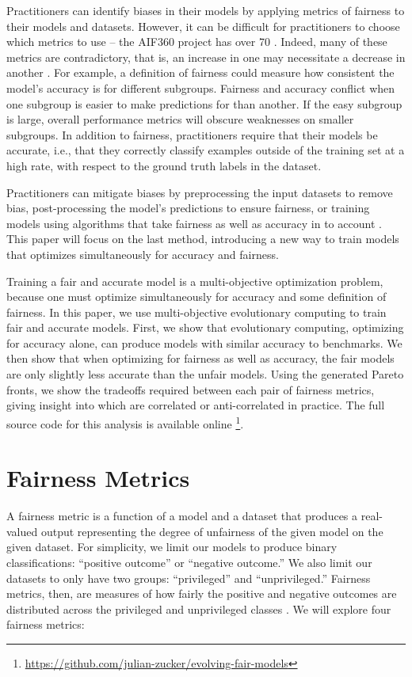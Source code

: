 \documentclass{elsarticle}
\begin{document}
Practitioners can identify biases in their models by applying metrics of fairness to their models and datasets. However, it can be difficult for practitioners to choose which metrics to use – the AIF360 project has over 70 \citep{Bellamy:2018}. Indeed, many of these metrics are contradictory, that is, an increase in one may necessitate a decrease in another \citep{Kleinberg:2016}. For example, a definition of fairness could measure how consistent the model’s accuracy is for different subgroups. Fairness and accuracy conflict when one subgroup is easier to make predictions for than another. If the easy subgroup is large, overall performance metrics will obscure weaknesses on smaller subgroups. In addition to fairness, practitioners require that their models be accurate, i.e., that they correctly classify examples outside of the training set at a high rate, with respect to the ground truth labels in the dataset.

Practitioners can mitigate biases by preprocessing the input datasets to remove bias, post-processing the model’s predictions to ensure fairness, or training models using algorithms that take fairness as well as accuracy in to account \citep{Angwin:2016}. This paper will focus on the last method, introducing a new way to train models that optimizes simultaneously for accuracy and fairness. 

Training a fair and accurate model is a multi-objective optimization problem, because one must optimize simultaneously for accuracy and some definition of fairness. In this paper, we use multi-objective evolutionary computing to train fair and accurate models. First, we show that evolutionary computing, optimizing for accuracy alone, can produce models with similar accuracy to benchmarks. We then show that when optimizing for fairness as well as accuracy, the fair models are only slightly less accurate than the unfair models. Using the generated Pareto fronts, we show the tradeoffs required between each pair of fairness metrics, giving insight into which are correlated or anti-correlated in practice. The full source code for this analysis is available online \footnote{ \href{https://github.com/julian-zucker/evolving-fair-models}{https://github.com/julian-zucker/evolving-fair-models}}.

\section{Fairness Metrics}
A fairness metric is a function of a model and a dataset that produces a real-valued output representing the degree of unfairness of the given model on the given dataset. For simplicity, we limit our models to produce binary classifications: “positive outcome” or “negative outcome.” We also limit our datasets to only have two groups: “privileged” and “unprivileged.” Fairness metrics, then, are measures of how fairly the positive and negative outcomes are distributed across the privileged and unprivileged classes \citep{Binns:2017}. We will explore four fairness metrics:
\end{document}

